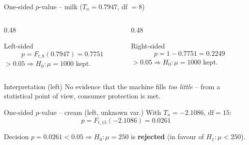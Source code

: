 \documentclass[aspectratio=169,11pt]{beamer}
\begin{document}
\begin{frame}{One-sided $p$-value -- milk ($T_n=0.7947$, df $=8$)}
  \begin{columns}[T]
    \begin{column}{0.48\textwidth}
      \begin{block}{Left-sided}
        \[ p = F_{t,8}(0.7947) = 0.7751 \]
        $> 0.05 \Rightarrow H_0:\mu=1000$ kept.
      \end{block}
    \end{column}
    \begin{column}{0.48\textwidth}
      \begin{block}{Right-sided}
        \[ p = 1-0.7751 = 0.2249 \]
        $> 0.05 \Rightarrow H_0:\mu=1000$ kept.
      \end{block}
    \end{column}
  \end{columns}
  \begin{exampleblock}{Interpretation (left)}
    No evidence that the machine fills \emph{too little} -- from a statistical
    point of view, consumer protection is met.
  \end{exampleblock}
\end{frame}

\begin{frame}{One-sided $p$-value -- cream (left, unknown var.)}
  With $T_n = -2.1086$, $\mathrm{df}=15$:
  \[
    p = F_{t,15}(-2.1086) = 0.0261
  \]
  \begin{alertblock}{Decision}
    $p = 0.0261 < 0.05 \Rightarrow H_0:\mu = 250$ is \textbf{rejected}
    (in favour of $H_1:\mu<250$).
  \end{alertblock}
\end{frame}
\end{document}
